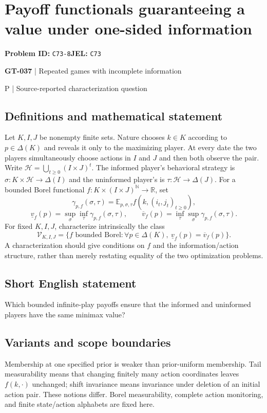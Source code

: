 \documentclass[11pt,a4paper]{article}
\begin{document}
\section*{Payoff functionals guaranteeing a value under one-sided information}
\textbf{Problem ID:} \texttt{C73-8}\quad \textbf{JEL:} \texttt{C73}\par
\label{problem:OP-0167}
\label{game:GT-037}
{\sffamily\small\color{muted}
{\sffamily\small\color{muted}\textbf{GT-037} | Repeated games with incomplete information\par P | Source-reported characterization question\par}
\par}
\subsection*{Definitions and mathematical statement}
Let $K,I,J$ be nonempty finite sets. Nature chooses $k\in K$ according to $p\in\Delta(K)$ and reveals it only to the maximizing player. At every date the two players simultaneously choose actions in $I$ and $J$ and then both observe the pair. Write $\mathcal H=\bigcup_{t\geq0}(I\times J)^t$. The informed player's behavioral strategy is $\sigma:K\times\mathcal H\to\Delta(I)$ and the uninformed player's is $\tau:\mathcal H\to\Delta(J)$. For a bounded Borel functional $f:K\times(I\times J)^{\mathbb N}\to\mathbb R$, set
\[
 \gamma_{p,f}(\sigma,\tau)=\mathbb E_{p,\sigma,\tau}f(k,(i_t,j_t)_{t\geq0}),
\]
\[
 \underline v_f(p)=\sup_\sigma\inf_\tau\gamma_{p,f}(\sigma,\tau),
 \qquad
 \overline v_f(p)=\inf_\tau\sup_\sigma\gamma_{p,f}(\sigma,\tau).
\]
For fixed $K,I,J$, characterize intrinsically the class
\[
 \mathcal V_{K,I,J}=\{f\text{ bounded Borel}:
 \forall p\in\Delta(K),\ \underline v_f(p)=\overline v_f(p)\}.
\]
A characterization should give conditions on $f$ and the information/action structure, rather than merely restating equality of the two optimization problems.
\subsection*{Short English statement}
Which bounded infinite-play payoffs ensure that the informed and uninformed players have the same minimax value?
\subsection*{Variants and scope boundaries}
Membership at one specified prior is weaker than prior-uniform membership. Tail measurability means that changing finitely many action coordinates leaves $f(k,\cdot)$ unchanged; shift invariance means invariance under deletion of an initial action pair. These notions differ. Borel measurability, complete action monitoring, and finite state/action alphabets are fixed here.
\end{document}
